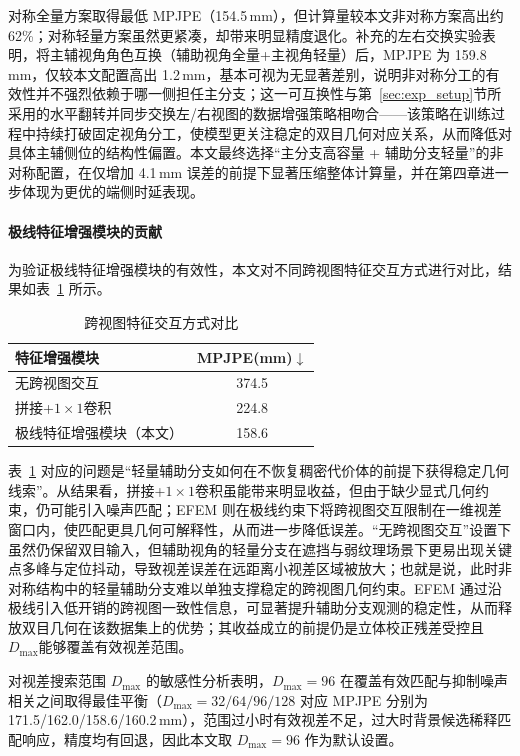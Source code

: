 对称全量方案取得最低 MPJPE（154.5\,mm），但计算量较本文非对称方案高出约 62\%；对称轻量方案虽然更紧凑，却带来明显精度退化。补充的左右交换实验表明，将主辅视角角色互换（辅助视角全量+主视角轻量）后，MPJPE 为 159.8\,mm，仅较本文配置高出 1.2\,mm，基本可视为无显著差别，说明非对称分工的有效性并不强烈依赖于哪一侧担任主分支；这一可互换性与第~\ref{sec:exp_setup}节所采用的水平翻转并同步交换左/右视图的数据增强策略相吻合——该策略在训练过程中持续打破固定视角分工，使模型更关注稳定的双目几何对应关系，从而降低对具体主辅侧位的结构性偏置。本文最终选择“主分支高容量 + 辅助分支轻量”的非对称配置，在仅增加 4.1\,mm 误差的前提下显著压缩整体计算量，并在第四章进一步体现为更优的端侧时延表现。

\paragraph{极线特征增强模块的贡献}
为验证极线特征增强模块的有效性，本文对不同跨视图特征交互方式进行对比，结果如表~\ref{tab:ablation_efem} 所示。
\begin{table}[htbp]
  \centering
  \small
\caption{跨视图特征交互方式对比}
  \label{tab:ablation_efem}
  \begin{tabular}{lc}
    \toprule
    特征增强模块 & MPJPE(mm)$\downarrow$ \\
    \midrule
    无跨视图交互 & 374.5 \\
    拼接+$1\times1$卷积 & 224.8 \\
    极线特征增强模块（本文） & 158.6 \\
    \bottomrule
  \end{tabular}
\end{table}

表~\ref{tab:ablation_efem} 对应的问题是“轻量辅助分支如何在不恢复稠密代价体的前提下获得稳定几何线索”。从结果看，拼接+$1\times1$卷积虽能带来明显收益，但由于缺少显式几何约束，仍可能引入噪声匹配；EFEM 则在极线约束下将跨视图交互限制在一维视差窗口内，使匹配更具几何可解释性，从而进一步降低误差。“无跨视图交互”设置下虽然仍保留双目输入，但辅助视角的轻量分支在遮挡与弱纹理场景下更易出现关键点多峰与定位抖动，导致视差误差在远距离小视差区域被放大；也就是说，此时非对称结构中的轻量辅助分支难以单独支撑稳定的跨视图几何约束。EFEM 通过沿极线引入低开销的跨视图一致性信息，可显著提升辅助分支观测的稳定性，从而释放双目几何在该数据集上的优势；其收益成立的前提仍是立体校正残差受控且$D_{\max}$能够覆盖有效视差范围。

对视差搜索范围 $D_{\max}$ 的敏感性分析表明，$D_{\max}=96$ 在覆盖有效匹配与抑制噪声相关之间取得最佳平衡（$D_{\max}=32/64/96/128$ 对应 MPJPE 分别为 171.5/162.0/158.6/160.2\,mm），范围过小时有效视差不足，过大时背景候选稀释匹配响应，精度均有回退，因此本文取 $D_{\max}=96$ 作为默认设置。

